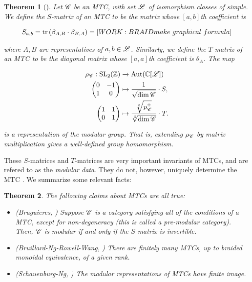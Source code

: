 \documentclass{article}
\newtheorem{theorem}{Theorem}[section]
\theoremstyle{definition}
\numberwithin{figure}{section}
\begin{document}
\begin{theorem}[\cite{bakalov2001lectures}] Let $\mathscr{C}$ be an MTC, with set $\mathscr{L}$ of isomorphism classes of simple. We define the $S$-matrix of an MTC to be the matrix whose $[a,b]$th coefficient is

$$S_{a,b}=\mathrm{tr}\left(\beta_{A,B}\cdot \beta_{B,A}\right)=[WORK: BRAID make \,\, graphical \,\, formula]$$

where $A,B$ are representatives of $a,b\in \mathscr{L}$. Similarly, we define the $T$-matrix of an MTC to be the diagonal matrix whose $[a,a]$th coefficient is $\theta_A$. The map

\begin{align*}
\rho_{\mathscr{C}}: \mathrm{SL}_2(\mathbb{Z})&\xrightarrow{} \mathrm{Aut}(\mathbb{C}[\mathscr{L}])\\
\begin{pmatrix}
0 & -1\\
1 & 0
\end{pmatrix}
&\mapsto \frac{1}{\sqrt{\dim \mathscr{C} }}\cdot S, \\
\begin{pmatrix}
1 & 1\\
0 & 1
\end{pmatrix}
&\mapsto \frac{\sqrt[3]{p^+_{\mathscr{C}}}}{\sqrt[6]{\dim \mathscr{C} }}\cdot T.
\end{align*}

is a representation of the modular group. That is, extending $\rho_{\mathscr{C}}$ by matrix multiplication gives a well-defined group homomorphism.
\end{theorem}

These $S$-matrices and $T$-matrices are very important invariants of MTCs, and are refered to as the \textit{modular data}. They do not, however, uniquely determine the MTC \cite{mignard2021modular}. We summarize some relevant facts:

\begin{theorem} The following claims about MTCs are all true:

\begin{itemize}
\item (Bruguieres, \cite{bruguieres2000categories}) Suppose $\mathscr{C}$ is a category satisfying all of the conditions of a MTC, except for non-degeneracy (this is called a pre-modular category). Then, $\mathscr{C}$ is modular if and only if the $S$-matrix is invertible.
\item (Bruillard-Ng-Rowell-Wang, \cite{bruillard2016rank}) There are finitely many MTCs, up to braided monoidal equivalence, of a given rank.
\item (Schauenburg-Ng, \cite{ng2010congruence}) The modular representations of MTCs have finite image.
\end{itemize}
\end{theorem}
\end{document}
